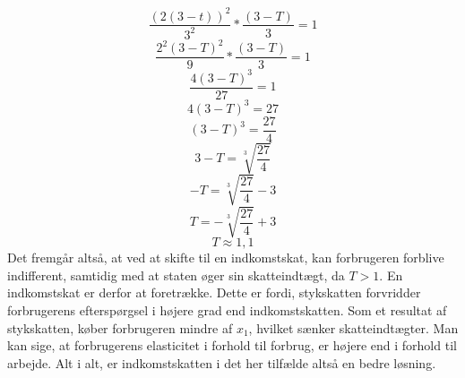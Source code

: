 \documentclass{article}
\begin{document}
\begin{equation}
    \frac{(2(3-t))^2}{3^2}*\frac{(3-T)}{3}=1
\end{equation}
\begin{equation}
    \frac{2^2(3-T)^2}{9}*\frac{(3-T)}{3}=1
\end{equation}
\begin{equation}
    \frac{4(3-T)^3}{27}=1
\end{equation}
\begin{equation}
    4(3-T)^3=27
\end{equation}
\begin{equation}
    (3-T)^3=\frac{27}{4}
\end{equation}
\begin{equation}
    3-T=\sqrt[3]{\frac{27}{4}}
\end{equation}
\begin{equation}
    -T=\sqrt[3]{\frac{27}{4}}-3
\end{equation}
\begin{equation}
    T=-\sqrt[3]{\frac{27}{4}}+3
\end{equation}
\begin{equation}
    T\approx1,1
\end{equation}
Det fremgår altså, at ved at skifte til en indkomstskat, kan forbrugeren forblive indifferent, samtidig med at staten øger sin skatteindtægt, da $T>1$. En indkomstskat er derfor at foretrække. Dette er fordi, stykskatten forvridder forbrugerens efterspørgsel i højere grad end indkomstskatten. Som et resultat af stykskatten, køber forbrugeren mindre af $x_1$, hvilket sænker skatteindtægter. Man kan sige, at forbrugerens elasticitet i forhold til forbrug, er højere end i forhold til arbejde. Alt i alt, er indkomstskatten i det her tilfælde altså en bedre løsning. 
\end{document}
